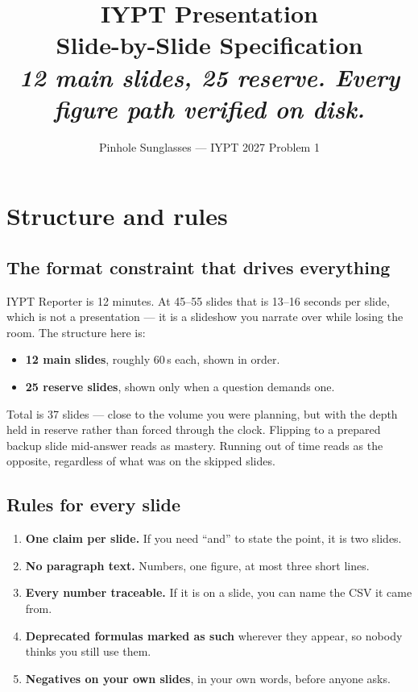 \documentclass[11pt]{report}
\title{\textbf{\Huge IYPT Presentation}\\[0.3cm]
\textcolor{hbblue}{\huge Slide-by-Slide Specification}\\[0.5cm]
\large\itshape 12 main slides, 25 reserve. Every figure path verified on disk.}
\author{}
\date{Pinhole Sunglasses --- IYPT 2027 Problem 1}
\begin{document}
\maketitle
\tableofcontents

\chapter{Structure and rules}

\section{The format constraint that drives everything}

IYPT Reporter is 12 minutes. At 45--55 slides that is 13--16 seconds per slide, which is not a
presentation --- it is a slideshow you narrate over while losing the room. The structure here is:

\begin{itemize}[leftmargin=1.2cm]
\item \textbf{12 main slides}, roughly 60\,s each, shown in order.
\item \textbf{25 reserve slides}, shown only when a question demands one.
\end{itemize}

Total is 37 slides --- close to the volume you were planning, but with the depth held in reserve
rather than forced through the clock. Flipping to a prepared backup slide mid-answer reads as
mastery. Running out of time reads as the opposite, regardless of what was on the skipped slides.

\section{Rules for every slide}

\begin{enumerate}[leftmargin=1.2cm]
\item \textbf{One claim per slide.} If you need ``and'' to state the point, it is two slides.
\item \textbf{No paragraph text.} Numbers, one figure, at most three short lines.
\item \textbf{Every number traceable.} If it is on a slide, you can name the CSV it came from.
\item \textbf{Deprecated formulas marked as such} wherever they appear, so nobody thinks you still use them.
\item \textbf{Negatives on your own slides}, in your own words, before anyone asks.
\end{enumerate}
\end{document}
